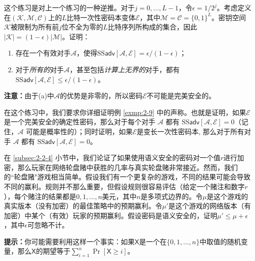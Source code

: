 \begin{exercise}[匹配的边界]\label{exer:2-6}
这个练习是对上一个练习的一种逆推。对于$j=0,\dots,L-1$，令$\epsilon=1/2^j$。考虑定义在$(\mathcal{K},\mathcal{M},\mathcal{C})$上的$L$比特一次性密码本变体$\mathcal{E}$，其中$\mathcal{M}=\mathcal{C}=\{0,1\}^L$。密钥空间$\mathcal{K}$被限制为所有前$j$位不全为零的$L$比特序列所构成的集合，因此 $|\mathcal{K}|=(1-\epsilon)|\mathcal{M}|$。证明：
\begin{enumerate}[\indent(a)]
	\item 存在一个有效对手$\mathcal{A}$，使得$\mathrm{SS}\mathsf{adv}[\mathcal{A},\mathcal{E}]=\epsilon/(1-\epsilon)$；
	\item 对于\emph{所有的}对手$\mathcal{A}$，甚至包括\emph{计算上无界的}对手，都有$\mathrm{SS}\mathsf{adv}[\mathcal{A},\mathcal{E}]\leq\epsilon/(1-\epsilon)$。
\end{enumerate}
\textbf{注意：}由于(a)中$\mathcal{A}$的优势是非零的，所以密码$\mathcal{E}$不可能是完美安全的。
\end{exercise}

\begin{exercise}[确定性密码]\label{exer:2-7}
在这个练习中，我们要求你详细证明例 \ref{exmp:2-9} 中的声称。也就是证明，如果$\mathcal{E}$是一个完美安全的确定性密码，那么对于每个对手 $\mathcal{A}$ 都有 $\mathrm{SS}\mathsf{adv}[\mathcal{A},\mathcal{E}]=0$（记住，$\mathcal{A}$ 可能是概率性的）；同时证明，如果$\mathcal{E}$是变长一次性密码本, 那么对于所有对手 $\mathcal{A}$ 都有 $\mathrm{SS}\mathsf{adv}[\mathcal{A},\mathcal{E}]=0$。
\end{exercise}

\begin{exercise}[轮盘赌]\label{exer:2-8}
在 \ref{subsec:2-2-4} 小节中，我们论证了如果使用语义安全的密码对一个值$r$进行加密，那么玩家在网络轮盘赌中获胜的几率与真实轮盘赌非常接近。然而，我们的``轮盘赌"游戏相当简单。假设我们有一个更复杂的游戏，不同的结果可能会导致不同的赢利。规则并不那么重要，但假设规则很容易评估（给定一个赌注和数字$r$），每个赌注的结果都是$0,1,\dots,n$美元，其中$n$是多项式边界的。令$\mu$是这个游戏的真实版本（没有加密）的最佳策略中的预期赢利。令$\mu'$是这个游戏的网络版本（有加密）中某个（有效）玩家的预期赢利。假设密码是语义安全的，证明$\mu'\leq\mu+\epsilon$，其中$\epsilon$可忽略不计。

	\vspace{3pt}
	
\noindent
\textbf{提示：}你可能需要利用这样一个事实：如果$\mathsf{X}$是一个在$\{0,1,\dots,n\}$中取值的随机变量，那么$\mathsf{X}$的期望等于$\sum_{i=1}^n\Pr[\mathsf{X}\geq i]$。
\end{exercise}

